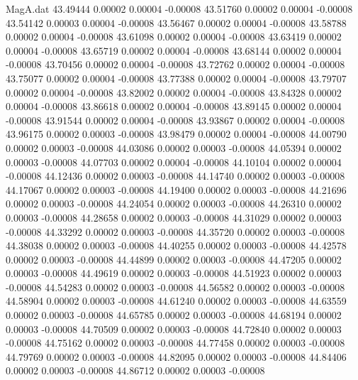 \begin{filecontents}{MagA.dat}
  43.49444    0.00002    0.00004   -0.00008
  43.51760    0.00002    0.00004   -0.00008
  43.54142    0.00003    0.00004   -0.00008
  43.56467    0.00002    0.00004   -0.00008
  43.58788    0.00002    0.00004   -0.00008
  43.61098    0.00002    0.00004   -0.00008
  43.63419    0.00002    0.00004   -0.00008
  43.65719    0.00002    0.00004   -0.00008
  43.68144    0.00002    0.00004   -0.00008
  43.70456    0.00002    0.00004   -0.00008
  43.72762    0.00002    0.00004   -0.00008
  43.75077    0.00002    0.00004   -0.00008
  43.77388    0.00002    0.00004   -0.00008
  43.79707    0.00002    0.00004   -0.00008
  43.82002    0.00002    0.00004   -0.00008
  43.84328    0.00002    0.00004   -0.00008
  43.86618    0.00002    0.00004   -0.00008
  43.89145    0.00002    0.00004   -0.00008
  43.91544    0.00002    0.00004   -0.00008
  43.93867    0.00002    0.00004   -0.00008
  43.96175    0.00002    0.00003   -0.00008
  43.98479    0.00002    0.00004   -0.00008
  44.00790    0.00002    0.00003   -0.00008
  44.03086    0.00002    0.00003   -0.00008
  44.05394    0.00002    0.00003   -0.00008
  44.07703    0.00002    0.00004   -0.00008
  44.10104    0.00002    0.00004   -0.00008
  44.12436    0.00002    0.00003   -0.00008
  44.14740    0.00002    0.00003   -0.00008
  44.17067    0.00002    0.00003   -0.00008
  44.19400    0.00002    0.00003   -0.00008
  44.21696    0.00002    0.00003   -0.00008
  44.24054    0.00002    0.00003   -0.00008
  44.26310    0.00002    0.00003   -0.00008
  44.28658    0.00002    0.00003   -0.00008
  44.31029    0.00002    0.00003   -0.00008
  44.33292    0.00002    0.00003   -0.00008
  44.35720    0.00002    0.00003   -0.00008
  44.38038    0.00002    0.00003   -0.00008
  44.40255    0.00002    0.00003   -0.00008
  44.42578    0.00002    0.00003   -0.00008
  44.44899    0.00002    0.00003   -0.00008
  44.47205    0.00002    0.00003   -0.00008
  44.49619    0.00002    0.00003   -0.00008
  44.51923    0.00002    0.00003   -0.00008
  44.54283    0.00002    0.00003   -0.00008
  44.56582    0.00002    0.00003   -0.00008
  44.58904    0.00002    0.00003   -0.00008
  44.61240    0.00002    0.00003   -0.00008
  44.63559    0.00002    0.00003   -0.00008
  44.65785    0.00002    0.00003   -0.00008
  44.68194    0.00002    0.00003   -0.00008
  44.70509    0.00002    0.00003   -0.00008
  44.72840    0.00002    0.00003   -0.00008
  44.75162    0.00002    0.00003   -0.00008
  44.77458    0.00002    0.00003   -0.00008
  44.79769    0.00002    0.00003   -0.00008
  44.82095    0.00002    0.00003   -0.00008
  44.84406    0.00002    0.00003   -0.00008
  44.86712    0.00002    0.00003   -0.00008

\end{filecontents}
